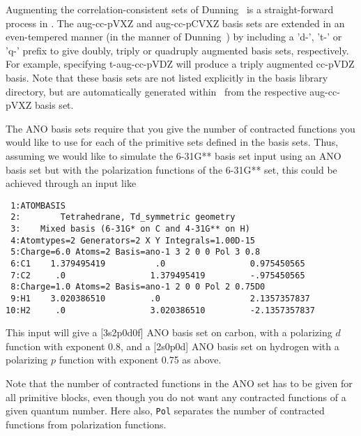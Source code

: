Augmenting the correlation-consistent 
sets of Dunning~\cite{dewthdjcp100} is a straight-forward process in \dalton. 
The aug-cc-pVXZ and aug-cc-pCVXZ basis sets are extended in an even-tempered manner 
(in the manner of Dunning~\cite{dewthdjcp100})
by including a 'd-', 't-' or 'q-' prefix to give doubly, triply or quadruply 
augmented basis sets, respectively. For example, specifying t-aug-cc-pVDZ will
produce a triply augmented cc-pVDZ basis.
Note that these basis sets are not listed 
explicitly in the basis library directory, 
but are automatically generated within \dalton\ from the respective 
aug-cc-pVXZ
basis set.

The ANO basis sets require that you give the number of contracted
functions you would like to use for each of the primitive sets defined
in the basis sets. Thus, assuming we would like to simulate the
6-31G** basis set input using an ANO basis set but with the
polarization functions of the 6-31G** set, this could be achieved
through an input like

\begin{verbatim}
 1:ATOMBASIS
 2:        Tetrahedrane, Td_symmetric geometry
 3:    Mixed basis (6-31G* on C and 4-31G** on H)
 4:Atomtypes=2 Generators=2 X Y Integrals=1.00D-15
 5:Charge=6.0 Atoms=2 Basis=ano-1 3 2 0 0 Pol 3 0.8
 6:C1    1.379495419          .0                 0.975450565
 7:C2     .0                 1.379495419         -.975450565
 8:Charge=1.0 Atoms=2 Basis=ano-1 2 0 0 Pol 2 0.75D0
 9:H1    3.020386510         .0                  2.1357357837
10:H2     .0                 3.020386510         -2.1357357837
\end{verbatim}

This input will give a [3s2p0d0f] ANO basis set
on carbon, with a
polarizing $d$ function with exponent 0.8, and a [2s0p0d] ANO basis
set on hydrogen with a polarizing $p$ function with exponent 0.75 as
above.

Note that the number of contracted functions in the ANO
set has to be
given for all primitive blocks, even though you do not want any
contracted functions of a given quantum number. Here also, {\tt Pol}
separates the number of contracted functions from polarization
functions.

